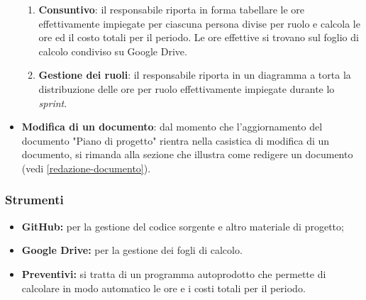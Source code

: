\begin{itemize}
\begin{enumerate}
		      \item \textbf{Consuntivo}: il responsabile riporta in forma
		            tabellare le ore effettivamente impiegate per ciascuna
		            persona divise per ruolo e calcola le ore ed il costo
		            totali per il periodo. Le ore effettive si trovano sul foglio di calcolo condiviso su Google Drive.

		      \item \textbf{Gestione dei ruoli}: il responsabile riporta in
		            un diagramma a torta la distribuzione delle ore per ruolo
		            effettivamente impiegate durante lo \textit{sprint}.
	      \end{enumerate}

	\item \textbf{Modifica di un documento}: dal momento che
	      l'aggiornamento del documento "Piano di progetto" rientra nella
	      casistica di modifica di un documento, si rimanda alla sezione
	      che illustra come redigere un documento (vedi
	      \ref{redazione-documento}).
\end{itemize}

\subsubsection{Strumenti}
\begin{itemize}
	\item \textbf{GitHub\g:} per la gestione del codice sorgente e altro
	      materiale di progetto;

	\item \textbf{Google Drive:} per la gestione dei fogli di calcolo.

	\item \textbf{Preventivi:} si tratta di un programma autoprodotto che
	      permette di calcolare in modo automatico le ore e i costi totali per
	      il periodo.
\end{itemize}
